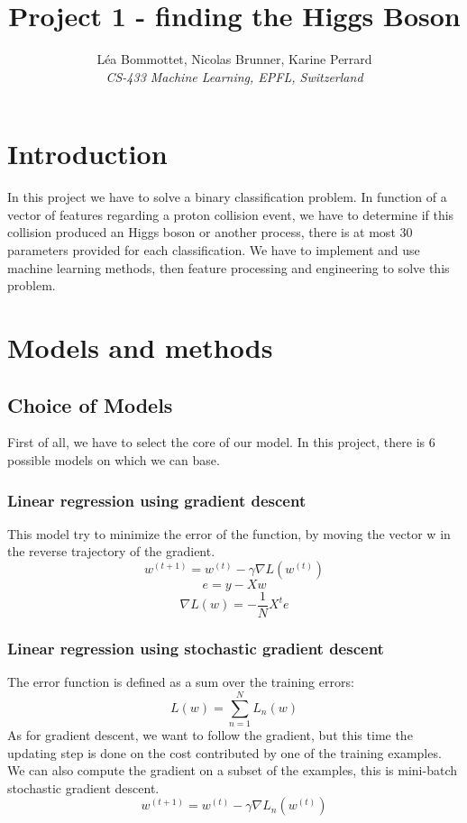 \documentclass[10pt,conference,compsocconf]{IEEEtran}
\begin{document}
	\title{Project 1 - finding the Higgs Boson}
	
	\author{
		L\'ea Bommottet, Nicolas Brunner, Karine Perrard\\
		\textit{CS-433 Machine Learning, EPFL, Switzerland}
	}
	
	\maketitle
	
	\section{Introduction}
	
	In this project we have to solve a binary classification problem. In function of a vector of features regarding a proton collision event, we have to determine if this collision produced an Higgs boson or another process,
	there is at most 30 parameters provided for each classification. We have to implement and use machine learning methods, then feature processing and engineering to solve this problem.
	
	\section{Models and methods}
	
	\subsection{Choice of Models}
	First of all, we have to select the core of our model. In this project, there is 6 possible models on which we can base.
	\subsubsection{Linear regression using gradient descent}
	
	This model try to minimize the error of the function, by moving the vector w in the reverse trajectory of the gradient.
	$$w^{(t+1)}=w^{(t)} -\gamma \nabla L(w^{(t)})$$
	$$e = y-Xw$$
	$$\nabla L(w) = -\frac{1}{N}X^te$$
	
	\subsubsection{Linear regression using stochastic gradient descent}
	
	The error function is defined as a sum over the training errors: \\
	$$ L(w) = \sum\limits_{n=1}^N L_n(w)$$
	As for gradient descent, we want to follow the gradient, but this time the updating step is done on the cost contributed by one of the training examples. We can also compute the gradient on a subset of the examples, this is mini-batch stochastic gradient descent.
	$$w^{(t+1)}=w^{(t)} -\gamma \nabla L_n(w^{(t)})$$
	
\end{document}
